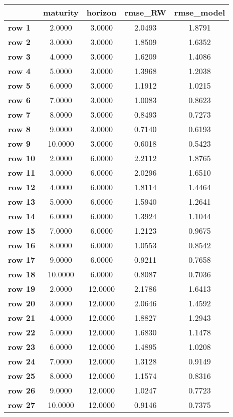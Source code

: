 \begin{tiny}\begin{tabular}{|l|c|c|c|c|}
\hline
&\textbf{maturity}&\textbf{horizon}&\textbf{rmse_RW}&\textbf{rmse_model}\\\hline
\textbf{row 1}&2.0000&3.0000&2.0493&1.8791\\\hline
\textbf{row 2}&3.0000&3.0000&1.8509&1.6352\\\hline
\textbf{row 3}&4.0000&3.0000&1.6209&1.4086\\\hline
\textbf{row 4}&5.0000&3.0000&1.3968&1.2038\\\hline
\textbf{row 5}&6.0000&3.0000&1.1912&1.0215\\\hline
\textbf{row 6}&7.0000&3.0000&1.0083&0.8623\\\hline
\textbf{row 7}&8.0000&3.0000&0.8493&0.7273\\\hline
\textbf{row 8}&9.0000&3.0000&0.7140&0.6193\\\hline
\textbf{row 9}&10.0000&3.0000&0.6018&0.5423\\\hline
\textbf{row 10}&2.0000&6.0000&2.2112&1.8765\\\hline
\textbf{row 11}&3.0000&6.0000&2.0296&1.6510\\\hline
\textbf{row 12}&4.0000&6.0000&1.8114&1.4464\\\hline
\textbf{row 13}&5.0000&6.0000&1.5940&1.2641\\\hline
\textbf{row 14}&6.0000&6.0000&1.3924&1.1044\\\hline
\textbf{row 15}&7.0000&6.0000&1.2123&0.9675\\\hline
\textbf{row 16}&8.0000&6.0000&1.0553&0.8542\\\hline
\textbf{row 17}&9.0000&6.0000&0.9211&0.7658\\\hline
\textbf{row 18}&10.0000&6.0000&0.8087&0.7036\\\hline
\textbf{row 19}&2.0000&12.0000&2.1786&1.6413\\\hline
\textbf{row 20}&3.0000&12.0000&2.0646&1.4592\\\hline
\textbf{row 21}&4.0000&12.0000&1.8827&1.2943\\\hline
\textbf{row 22}&5.0000&12.0000&1.6830&1.1478\\\hline
\textbf{row 23}&6.0000&12.0000&1.4895&1.0208\\\hline
\textbf{row 24}&7.0000&12.0000&1.3128&0.9149\\\hline
\textbf{row 25}&8.0000&12.0000&1.1574&0.8316\\\hline
\textbf{row 26}&9.0000&12.0000&1.0247&0.7723\\\hline
\textbf{row 27}&10.0000&12.0000&0.9146&0.7375\\\hline
\end{tabular}
\end{tiny}